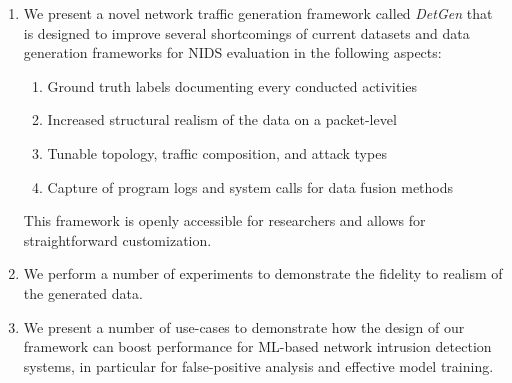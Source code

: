 \documentclass{article}
\begin{document}
\begin{enumerate}
\item We present a novel network traffic generation framework called \textit{DetGen} that is designed to improve several shortcomings of current datasets and data generation frameworks for NIDS evaluation in the following aspects:
\begin{enumerate}
\item Ground truth labels documenting every conducted activities
\item Increased structural realism of the data on a packet-level
\item Tunable topology, traffic composition, and attack types
\item Capture of program logs and system calls for data fusion methods
\end{enumerate}
This framework is openly accessible for researchers and allows for straightforward customization.
 
\item We perform a number of experiments to demonstrate the fidelity to realism of the generated data.
\item We present a number of use-cases to demonstrate how the design of our framework can boost performance for ML-based network intrusion detection systems, in particular for false-positive analysis and effective model training.
\end{enumerate}


\end{document}
